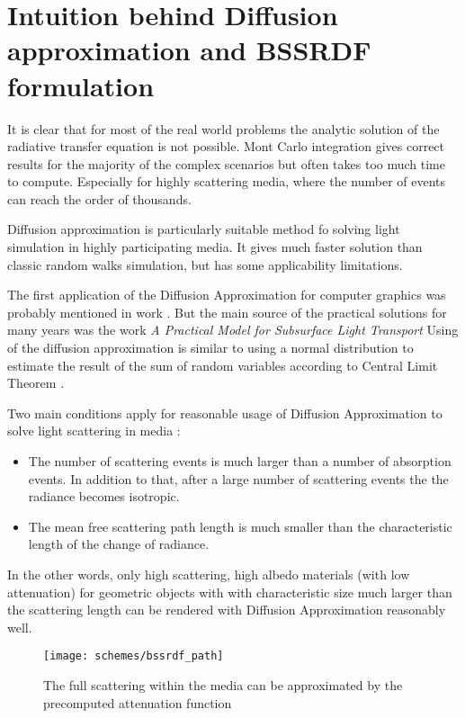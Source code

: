 \section{Intuition behind Diffusion approximation and BSSRDF formulation}
\label{section:BSSRDF_intuition}
It is clear that for most of the real world problems the analytic solution of the radiative transfer
equation is not possible. Mont Carlo integration gives correct results for the majority of the
complex scenarios but often takes too much time to compute. Especially for highly scattering media,
where the number of events can reach the order of thousands.

Diffusion approximation is particularly suitable method fo solving light simulation in highly
participating media. It gives much faster solution than classic random walks simulation, but has
some applicability limitations.

The first application of the Diffusion Approximation for computer graphics was probably mentioned in
work \cite{Stam1995}. But the main source of the practical solutions for many years was the work
\emph{A Practical Model for Subsurface Light Transport} \cite{Jensen:2001:PMS:383259.383319} Using
of the diffusion approximation is similar to using a normal distribution to estimate the result of
the sum of random variables according to Central Limit Theorem \cite{Glynn1990145}.

Two main conditions apply for reasonable usage of Diffusion Approximation to solve light scattering
in media \cite{wang2007biomedical}:
\begin{itemize}
  \item The number of scattering events is much larger than a number of absorption events. In
  addition to that, after a large number of scattering events the the radiance becomes isotropic.
  \item The mean free scattering path length is much smaller than the characteristic length of the
  change of radiance.
\end{itemize}

In the other words, only high scattering, high albedo materials (with low attenuation) for geometric
objects with with characteristic size much larger than the scattering length can be rendered with
Diffusion Approximation reasonably well.

\begin{figure}[h]
    \centering
    \texttt{[image: schemes/bssrdf\_path]}
    \caption{The full scattering within the media can be approximated by the precomputed attenuation
    function}
    \label{fig:bssrdf_path}
\end{figure}

